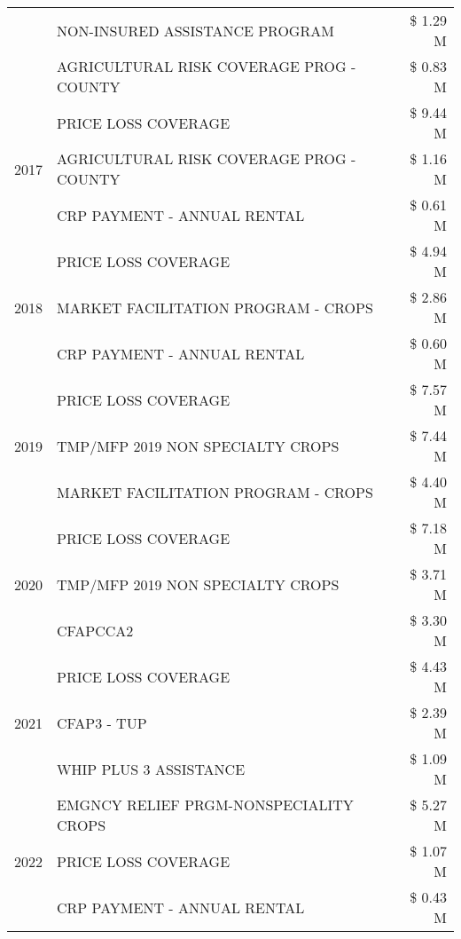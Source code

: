 \begin{tabular}{llr}
 & NON-INSURED ASSISTANCE PROGRAM & \$ 1.29 M \\
 & AGRICULTURAL RISK COVERAGE PROG - COUNTY & \$ 0.83 M \\
\cline{1-3}
\multirow[t]{3}{*}{2017} & PRICE LOSS COVERAGE & \$ 9.44 M \\
 & AGRICULTURAL RISK COVERAGE PROG - COUNTY & \$ 1.16 M \\
 & CRP PAYMENT - ANNUAL RENTAL & \$ 0.61 M \\
\cline{1-3}
\multirow[t]{3}{*}{2018} & PRICE LOSS COVERAGE & \$ 4.94 M \\
 & MARKET FACILITATION PROGRAM - CROPS & \$ 2.86 M \\
 & CRP PAYMENT - ANNUAL RENTAL & \$ 0.60 M \\
\cline{1-3}
\multirow[t]{3}{*}{2019} & PRICE LOSS COVERAGE & \$ 7.57 M \\
 & TMP/MFP 2019 NON SPECIALTY CROPS & \$ 7.44 M \\
 & MARKET FACILITATION PROGRAM - CROPS & \$ 4.40 M \\
\cline{1-3}
\multirow[t]{3}{*}{2020} & PRICE LOSS COVERAGE & \$ 7.18 M \\
 & TMP/MFP 2019 NON SPECIALTY CROPS & \$ 3.71 M \\
 & CFAPCCA2 & \$ 3.30 M \\
\cline{1-3}
\multirow[t]{3}{*}{2021} & PRICE LOSS COVERAGE & \$ 4.43 M \\
 & CFAP3 - TUP & \$ 2.39 M \\
 & WHIP PLUS 3 ASSISTANCE & \$ 1.09 M \\
\cline{1-3}
\multirow[t]{3}{*}{2022} & EMGNCY RELIEF PRGM-NONSPECIALITY CROPS & \$ 5.27 M \\
 & PRICE LOSS COVERAGE & \$ 1.07 M \\
 & CRP PAYMENT - ANNUAL RENTAL & \$ 0.43 M \\
\cline{1-3}
\bottomrule
\end{tabular}
